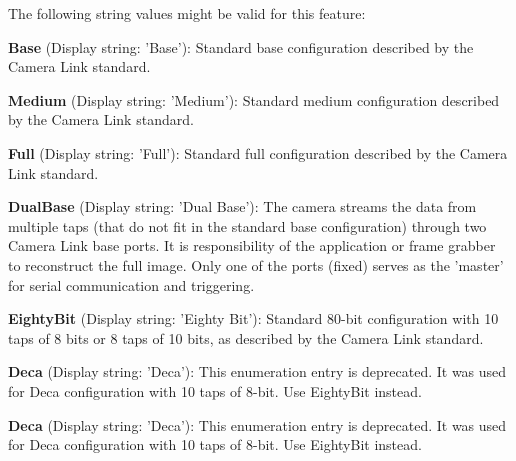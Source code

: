 The following string values might be valid for this feature\+:
\begin{DoxyItemize}
\item {\bfseries Base} (Display string\+: 'Base')\+: Standard base configuration described by the Camera Link standard.
\item {\bfseries Medium} (Display string\+: 'Medium')\+: Standard medium configuration described by the Camera Link standard.
\item {\bfseries Full} (Display string\+: 'Full')\+: Standard full configuration described by the Camera Link standard.
\item {\bfseries Dual\+Base} (Display string\+: 'Dual Base')\+: The camera streams the data from multiple taps (that do not fit in the standard base configuration) through two Camera Link base ports. It is responsibility of the application or frame grabber to reconstruct the full image. Only one of the ports (fixed) serves as the 'master' for serial communication and triggering.
\item {\bfseries Eighty\+Bit} (Display string\+: 'Eighty Bit')\+: Standard 80-\/bit configuration with 10 taps of 8 bits or 8 taps of 10 bits, as described by the Camera Link standard.
\item {\bfseries Deca} (Display string\+: 'Deca')\+: This enumeration entry is deprecated. It was used for Deca configuration with 10 taps of 8-\/bit. Use Eighty\+Bit instead.
\item {\bfseries Deca} (Display string\+: 'Deca')\+: This enumeration entry is deprecated. It was used for Deca configuration with 10 taps of 8-\/bit. Use Eighty\+Bit instead.
\end{DoxyItemize}

